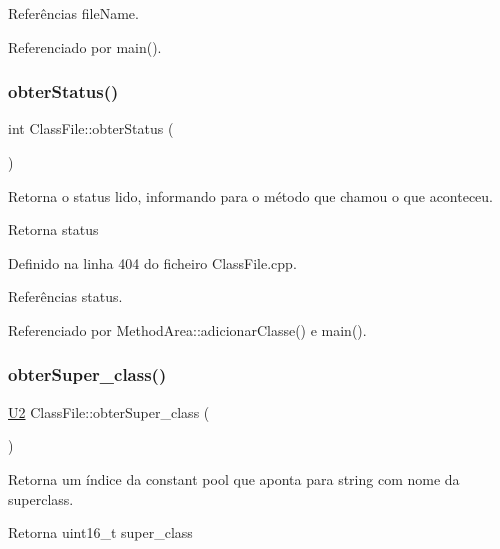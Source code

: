 Referências file\+Name.



Referenciado por main().

\mbox{\label{classClassFile_a170339cd16cf0afc0567865b3f372d38}} 
\subsubsection{\texorpdfstring{obter\+Status()}{obterStatus()}}
{\footnotesize\ttfamily int Class\+File\+::obter\+Status (\begin{DoxyParamCaption}{ }\end{DoxyParamCaption})}



Retorna o status lido, informando para o método que chamou o que aconteceu. 

\begin{DoxyReturn}{Retorna}
status 
\end{DoxyReturn}


Definido na linha 404 do ficheiro Class\+File.\+cpp.



Referências status.



Referenciado por Method\+Area\+::adicionar\+Classe() e main().

\mbox{\label{classClassFile_a8f248001f388181db10e76602031d560}} 
\subsubsection{\texorpdfstring{obter\+Super\+\_\+class()}{obterSuper\_class()}}
{\footnotesize\ttfamily \hyperlink{BasicTypes_8h_a90240657108b1b457eef9d3f76e0202e}{U2} Class\+File\+::obter\+Super\+\_\+class (\begin{DoxyParamCaption}{ }\end{DoxyParamCaption})}



Retorna um índice da constant pool que aponta para string com nome da superclass. 

\begin{DoxyReturn}{Retorna}
uint16\+\_\+t super\+\_\+class 
\end{DoxyReturn}


